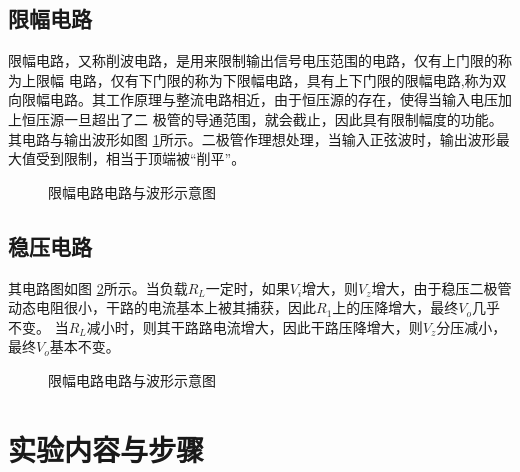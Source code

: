 \documentclass[a4paper,11pt,UTF8]{ctexart}
\begin{document}
\subsection{限幅电路}
限幅电路，又称削波电路，是用来限制输出信号电压范围的电路，仅有上门限的称为上限幅
电路，仅有下门限的称为下限幅电路，具有上下门限的限幅电路,称为双向限幅电路。其工作原理与整流电路相近，由于恒压源的存在，使得当输入电压加上恒压源一旦超出了二
极管的导通范围，就会截止，因此具有限制幅度的功能。其电路与输出波形如图 \ref{fig:limiter}所示。二极管作理想处理，当输入正弦波时，输出波形最大值受到限制，相当于顶端被“削平”。
\begin{figure}[htbp]
  \centering
  \caption{限幅电路电路与波形示意图}
  \label{fig:limiter}
  \end{figure}

\subsection{稳压电路}
其电路图如图 \ref{fig:stabler}所示。当负载$R_L$一定时，如果$V_i$增大，则$V_z$增大，由于稳压二极管动态电阻很小，干路的电流基本上被其捕获，因此$R_1$上的压降增大，最终$V_o$几乎不变。
当$R_L$减小时，则其干路路电流增大，因此干路压降增大，则$V_z$分压减小，最终$V_o$基本不变。
\begin{figure}[htbp]
  \centering
  \caption{限幅电路电路与波形示意图}
  \label{fig:stabler}
  \end{figure}


\section{实验内容与步骤}
\end{document}
